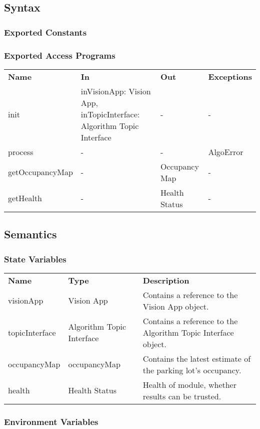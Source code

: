 \documentclass[12pt, titlepage]{article}
\begin{document}
\subsection{Syntax}
\subsubsection{Exported Constants}
\subsubsection{Exported Access Programs}
\begin{center}
\begin{tabular}{p{3.5cm} p{2.5cm} p{2.5cm} p{5cm}}
\hline
\textbf{Name} & \textbf{In} & \textbf{Out} & \textbf{Exceptions} \\
init & inVisionApp: Vision App, inTopicInterface: Algorithm Topic Interface & - & - \\
process & -  & - & AlgoError \\
getOccupancyMap & - & Occupancy Map & - \\
getHealth & - & Health Status & - \\
\hline
\hline
\end{tabular}
\end{center}
\subsection{Semantics}
\subsubsection{State Variables}
\begin{center}
\begin{tabular}{p{3 cm} p{4cm} p{5cm} }
\hline
\textbf{Name} & \textbf{Type} & \textbf{Description}  \\
visionApp & Vision App & Contains a reference to the Vision App object. \\
topicInterface & Algorithm Topic Interface & Contains a reference to the Algorithm Topic Interface object.\\
occupancyMap & occupancyMap & Contains the latest estimate of the parking lot's occupancy. \\
health & Health Status & Health of module, whether results can be trusted.   \\
\hline
\hline
\end{tabular}
\end{center}
\subsubsection{Environment Variables}
\end{document}
